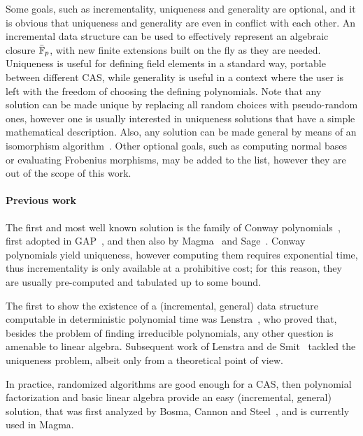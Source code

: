 \documentclass{sig-alternate}
\begin{document}
Some goals, such as incrementality, uniqueness and generality are
optional, and it is obvious that uniqueness and generality are even in
conflict with each other. %
An incremental data structure can be used to effectively represent an
algebraic closure $\bar{\mathbb{F}}_p$, with new finite extensions built on the
fly as they are needed. %
Uniqueness is useful for defining field elements in a standard way,
portable between different CAS, while generality is useful in a
context where the user is left with the freedom of choosing the
defining polynomials. %
Note that any solution can be made unique by replacing all random
choices with pseudo-random ones, however one is usually interested in
uniqueness solutions that have a simple mathematical description. %
Also, any solution can be made general by means of an isomorphism
algorithm~\cite{LenstraJr91,Allombert02,rains2008,brieulle2018computing,narayanan2016fast}. %
Other optional goals, such as computing normal bases or evaluating
Frobenius morphisms, may be added to the list, however they are out of
the scope of this work.

\paragraph{Previous work}
The first and most well known solution is the family of Conway
polynomials~\cite{Nickel1988,heath+loehr99}, first adopted in
GAP~\cite{GAP4}, and then also by Magma~\cite{MAGMA} and
Sage~\cite{Sage}. %
Conway polynomials yield uniqueness, however computing them requires
exponential time, thus incrementality is only available at a
prohibitive cost; for this reason, they are usually pre-computed and
tabulated up to some bound.

The first to show the existence of a (incremental, general) data
structure computable in deterministic polynomial time was
Lenstra~\cite{LenstraJr91}, who proved that, besides the problem of
finding irreducible polynomials, any other question is amenable to
linear algebra. %
Subsequent work of Lenstra and de
Smit~\cite{lenstra+desmit08-stdmodels} tackled the uniqueness problem,
albeit only from a theoretical point of view. %

In practice, randomized algorithms are good enough for a CAS, then
polynomial factorization and basic linear algebra provide an easy
(incremental, general) solution, that was first analyzed by Bosma,
Cannon and Steel~\cite{bosma+cannon+steel97}, and is currently used in
Magma. %
\end{document}

